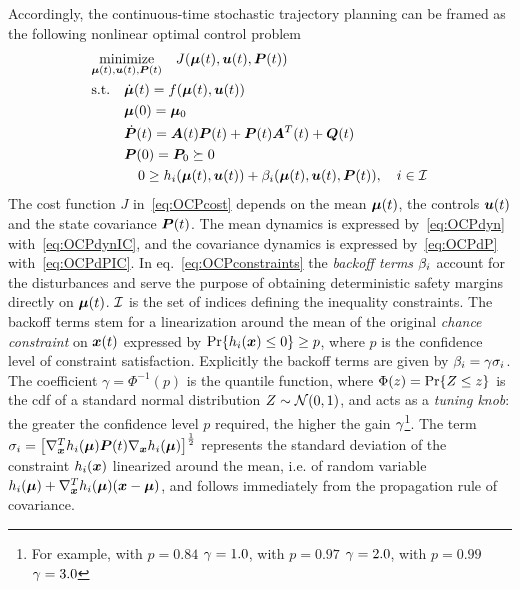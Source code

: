 Accordingly, the continuous-time stochastic trajectory planning can be framed as the following nonlinear optimal control problem
\begin{subequations}\label{eq:OCP}
\begin{align}
& \underset{\bmu(t), \bu(t), \bP(t)}{\text{minimize}} \quad J(\bmu(t), \bu(t), \bP(t)) \label{eq:OCPcost} \\
& \text{s.t.} \quad \dbmu(t)           = f(\bmu(t), \bu(t)) \label{eq:OCPdyn} \\
& \phantom{\text{s.t.} \quad} \bmu(0)  = \bmu_0 \label{eq:OCPdynIC} \\
& \phantom{\text{s.t.} \quad} \dbP(t) = \bA(t) \bP(t) + \bP(t) \bA^T(t) + \bQ(t) \label{eq:OCPdP} \\
& \phantom{\text{s.t.} \quad} \bP(0)  = \bP_0 \succeq 0 \label{eq:OCPdPIC} \\ %
&\phantom{\text{s.t.} \qquad} 0       \geq h_i(\bmu(t), \bu(t))
+ \be_i(\bmu(t), \bu(t), \bP(t)),
\quad i \in \calI \label{eq:OCPconstraints}
\end{align}
\end{subequations}
The cost function $J$ in~\eqref{eq:OCPcost} depends on the mean $\boldsymbol{\mu}(t)$, the controls $\boldsymbol{u}(t)$ and the state covariance $\boldsymbol{P}(t)$. The mean dynamics is expressed by~\eqref{eq:OCPdyn} with~\eqref{eq:OCPdynIC}, and the covariance dynamics is expressed by~\eqref{eq:OCPdP} with~\eqref{eq:OCPdPIC}. In eq.~\eqref{eq:OCPconstraints} the \emph{backoff terms} $\beta_i$ account for the disturbances and serve the purpose of obtaining deterministic safety margins directly on $\boldsymbol{\mu}(t)$. $\mathcal{I}$ is the set of indices defining the inequality constraints. The backoff terms stem for a linearization around the mean of the original \emph{chance constraint} on $\boldsymbol{x}(t)$ expressed by $\operatorname{Pr} \{h_i(\boldsymbol{x}) \leq 0\}\geq p$, where $p$ is the confidence level of constraint satisfaction. Explicitly the backoff terms are given by
$\beta_i = \gamma \sigma_i$. The coefficient $\gamma = \Phi^{-1}(p)$ is the quantile function, where $\Phi(z)=\operatorname{Pr} \{Z\leq z\}$ is the cdf of a standard normal distribution $Z \sim \mathcal{N}(0,1)$, and acts as a \emph{tuning knob}: the greater the confidence level $p$ required, the higher the gain $\gamma$\footnote{For example, with $p=0.84$ $\gamma = 1.0$, with $p=0.97$ $\gamma = 2.0$, with $p=0.99$ $\gamma = 3.0$}. The term $\sigma_i = \big[\nabla^T_{\boldsymbol{x}} h_i(\boldsymbol{\mu}) \boldsymbol{P}(t) \nabla_{\boldsymbol{x}} h_i(\boldsymbol{\mu})\big]^{\frac{1}{2}}$ represents the standard deviation of the constraint $h_i(\boldsymbol{x})$ linearized around the mean, i.e. of random variable $h_i(\boldsymbol{\mu})+\nabla^T_{\boldsymbol{x}} h_i(\boldsymbol{\mu}) (\boldsymbol{x} - \boldsymbol{\mu})$, and follows immediately from the propagation rule of covariance.

